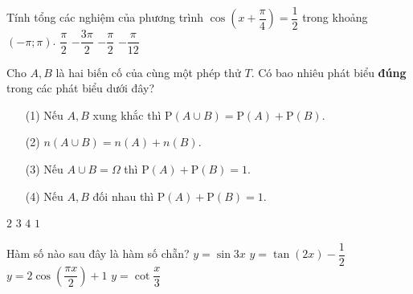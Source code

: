 \begin{ex}%
Tính tổng các nghiệm của phương trình $\cos \left( {x + \dfrac{\pi }{4}} \right) = \dfrac{1}{2}$  trong khoảng $\left( { - \pi ;\pi } \right)$.
\choice
{$\dfrac{\pi }{2}$}
{$-\dfrac{3\pi }{2}$}
{\True $-\dfrac{\pi }{2}$}
{$-\dfrac{\pi}{12}$}
\end{ex}

\begin{ex}%
Cho $A, B $ là hai biến cố của cùng một phép thử $T$. Có bao nhiêu phát biểu \textbf{đúng} trong các phát biểu dưới đây?
\begin{enumerate}
\item[(1)] Nếu $A, B$ xung khắc thì $\mathrm{P}\left( {A \cup B} \right) = \mathrm{P}(A) + \mathrm{P}(B)$.
\item[(2)] $n(A\cup B)=n(A)+n(B)$.
\item[(3)] Nếu $A\cup B=\Omega$  thì $\mathrm{P}(A)+\mathrm{P}(B)=1$.
\item[(4)] Nếu $A, B$ đối nhau thì $\mathrm{P}(A)+\mathrm{P}(B)=1$.
\end{enumerate}
\choice
{\True $2$}
{$3$}
{$4$}
{$1$}
\end{ex}

\begin{ex}%
Hàm số nào sau đây là hàm số chẵn?
\choice
{$y = \sin 3x$}
{$y = \tan(2x)-\dfrac{1}{2}$}
{\True $y = 2\cos \left(\dfrac{\pi x}{2}\right)+1$}
{$y = \cot\dfrac{x}{3}$}
\end{ex}

